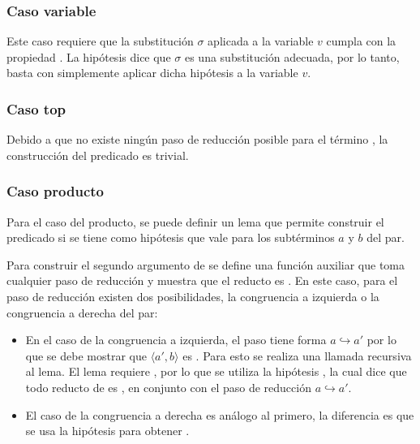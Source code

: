\subsubsection{Caso variable}

Este caso requiere que la substitución $\sigma$ aplicada a la variable $v$ cumpla con la propiedad
\snstar.
La hipótesis dice que $\sigma$ es una substitución adecuada, por lo tanto, basta con simplemente aplicar dicha hipótesis a la variable $v$.


\subsubsection{Caso top}

Debido a que no existe ningún paso de reducción posible para el término \const{$\star$}, la construcción del predicado es trivial.


\subsubsection{Caso producto}

Para el caso del producto, se puede definir un lema que permite construir el predicado si se tiene como hipótesis que \snstar vale para los subtérminos $a$ y $b$ del par.


Para construir el segundo argumento de  se define una función auxiliar  que toma cualquier paso de reducción y muestra que el reducto es \snstar.
En este caso, para el paso de reducción  existen dos posibilidades, la congruencia a izquierda o la congruencia a derecha del par:
\begin{itemize}
	\item En el caso de la congruencia a izquierda, el paso  tiene forma $a \hookrightarrow a'$ por lo que se debe mostrar que $\langle a', b \rangle$ es \snstar.
	Para esto se realiza una llamada recursiva al lema.
	El lema requiere \snstar {}, por lo que se utiliza la hipótesis , la cual dice que todo reducto de  es \snstar, en conjunto con el paso de reducción $a \hookrightarrow a'$.
	\item El caso de la congruencia a derecha es análogo al primero, la diferencia es que se usa la hipótesis  para obtener \snstar {}.
\end{itemize}

